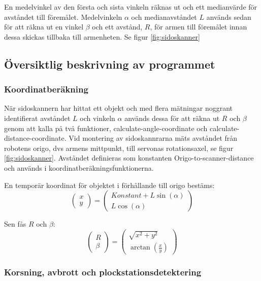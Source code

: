 En medelvinkel av den första och sista vinkeln räknas ut och ett medianvärde för avståndet till föremålet. Medelvinkeln $\alpha$ och medianavståndet $L$ används sedan för att räkna ut en vinkel $\beta$ och ett avstånd, $R$, för armen till föremålet innan dessa skickas tillbaka till armenheten. Se figur \ref{fig:sidoskanner}

\subsection{Översiktlig beskrivning av programmet}

\subsubsection{Koordinatberäkning}
När sidoskannern har hittat ett objekt och med flera mätningar noggrant identifierat avståndet $L$ och vinkeln $\alpha$ används dessa för att räkna ut $R$ och $\beta$ genom att kalla på två funktioner, calculate-angle-coordinate och calculate-distance-coordinate.
Vid montering av sidoskannrarna mäts avståndet från robotens origo, dvs armens mittpunkt, till servonas rotationsaxel, se figur \ref{fig:sidoskanner}. Avståndet definieras som konstanten Origo-to-scanner-distance och används i koordinatberäkningsfunktionerna.

En temporär koordinat för objektet i förhållande till origo bestäms:
$$\begin{pmatrix}
x \\ y
\end{pmatrix}
 = 
\begin{pmatrix}
Konstant+L \sin(\alpha) \\ 
L \cos(\alpha)
\end{pmatrix}$$

Sen fås $R$ och $\beta$:
$$\begin{pmatrix}
R \\ \beta
\end{pmatrix}
 = 
\begin{pmatrix}
\sqrt{x^2 + y^2} \\ 
\arctan(\frac{x}{y})
\end{pmatrix}$$

\subsubsection{Korsning, avbrott och plockstationsdetektering}

